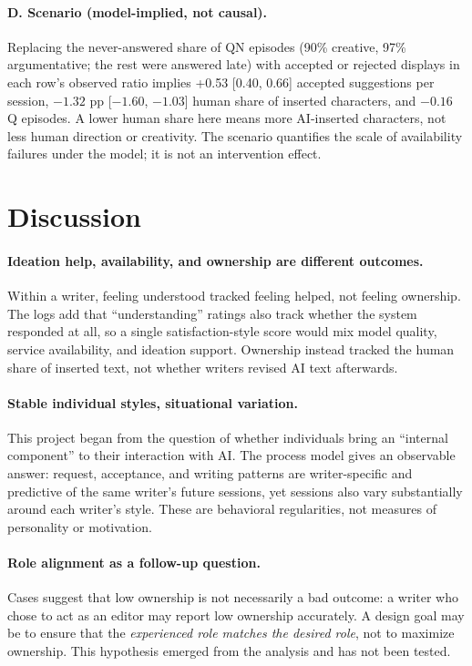 \documentclass[10pt]{article}
\begin{document}
\paragraph{D. Scenario (model-implied, not causal).} Replacing the never-answered share of QN episodes (90\% creative, 97\% argumentative; the rest were answered late) with accepted or rejected displays in each row's observed ratio implies +0.53 [0.40, 0.66] accepted suggestions per session, $-1.32$ pp [$-1.60$, $-1.03$] human share of inserted characters, and $-0.16$ Q episodes. A lower human share here means more AI-inserted characters, not less human direction or creativity. The scenario quantifies the scale of availability failures under the model; it is not an intervention effect.

\section{Discussion}
\paragraph{Ideation help, availability, and ownership are different outcomes.}
Within a writer, feeling understood tracked feeling helped, not feeling ownership. The logs add that ``understanding'' ratings also track whether the system responded at all, so a single satisfaction-style score would mix model quality, service availability, and ideation support. Ownership instead tracked the human share of inserted text, not whether writers revised AI text afterwards.

\paragraph{Stable individual styles, situational variation.}
This project began from the question of whether individuals bring an ``internal component'' to their interaction with AI. The process model gives an observable answer: request, acceptance, and writing patterns are writer-specific and predictive of the same writer's future sessions, yet sessions also vary substantially around each writer's style. These are behavioral regularities, not measures of personality or motivation.

\paragraph{Role alignment as a follow-up question.}
Cases suggest that low ownership is not necessarily a bad outcome: a writer who chose to act as an editor may report low ownership accurately. A design goal may be to ensure that the \emph{experienced role matches the desired role}, not to maximize ownership. This hypothesis emerged from the analysis and has not been tested.
\end{document}
